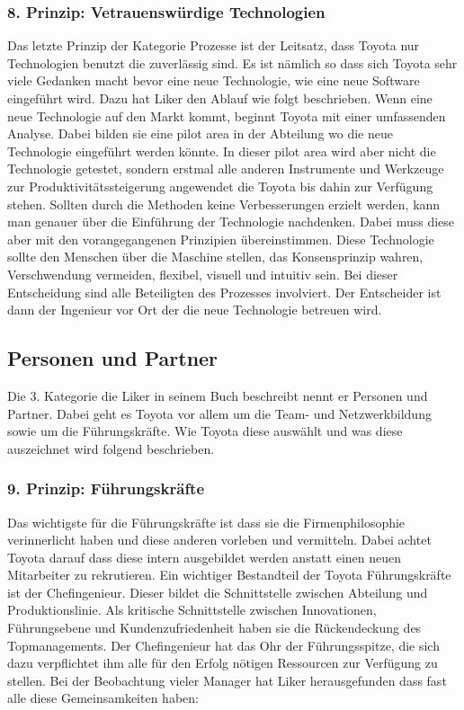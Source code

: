 \documentclass[a4paper,12pt]{scrartcl}
\begin{document}
\subsubsection{8. Prinzip: Vetrauenswürdige Technologien}

Das letzte Prinzip der Kategorie Prozesse ist der Leitsatz, dass Toyota nur Technologien benutzt die zuverlässig sind. Es ist nämlich so dass sich Toyota sehr viele Gedanken macht bevor eine neue Technologie, wie eine neue Software eingeführt wird. Dazu hat Liker den Ablauf wie folgt beschrieben. Wenn eine neue Technologie auf den Markt kommt, beginnt Toyota mit einer umfassenden Analyse. Dabei bilden sie eine pilot area in der Abteilung wo die neue Technologie eingeführt werden könnte. In dieser pilot area wird aber nicht die Technologie getestet, sondern erstmal alle anderen Instrumente und Werkzeuge zur Produktivitätssteigerung angewendet die Toyota bis dahin zur Verfügung stehen. Sollten durch die Methoden keine Verbesserungen erzielt werden, kann man genauer über die Einführung der Technologie nachdenken. Dabei muss diese aber mit den vorangegangenen Prinzipien übereinstimmen. Diese Technologie sollte den Menschen über die Maschine stellen, das Konsensprinzip wahren, Verschwendung vermeiden, flexibel, visuell und intuitiv sein. Bei dieser Entscheidung sind alle Beteiligten des Prozesses involviert. Der Entscheider ist dann der Ingenieur vor Ort der die neue Technologie betreuen wird. 

\subsection{Personen und Partner}

Die 3. Kategorie die Liker in seinem Buch beschreibt nennt er Personen und Partner. Dabei geht es Toyota vor allem um die Team- und Netzwerkbildung sowie um die Führungskräfte. Wie Toyota diese auswählt und was diese auszeichnet wird folgend beschrieben. 

\subsubsection{9. Prinzip: Führungskräfte}

Das wichtigste für die Führungskräfte ist dass sie die Firmenphilosophie verinnerlicht haben und diese anderen vorleben und vermitteln. Dabei achtet Toyota darauf dass diese intern ausgebildet werden anstatt einen neuen Mitarbeiter zu rekrutieren. Ein wichtiger Bestandteil der Toyota Führungskräfte ist der Chefingenieur. Dieser bildet die Schnittstelle zwischen Abteilung und Produktionslinie. Als kritische Schnittstelle zwischen Innovationen, Führungsebene und Kundenzufriedenheit haben sie die Rückendeckung des Topmanagements. Der Chefingenieur hat das Ohr der Führungsspitze, die sich dazu verpflichtet ihm alle für den Erfolg nötigen Ressourcen zur Verfügung zu stellen. 
Bei der Beobachtung vieler Manager hat Liker herausgefunden dass fast alle diese Gemeinsamkeiten haben:
\end{document}

